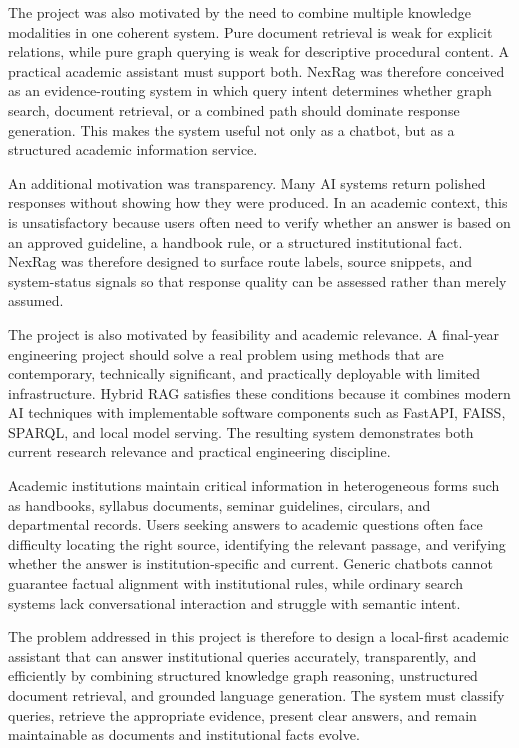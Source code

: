 The project was also motivated by the need to combine multiple knowledge modalities in one coherent system. Pure document retrieval is weak for explicit relations, while pure graph querying is weak for descriptive procedural content. A practical academic assistant must support both. NexRag was therefore conceived as an evidence-routing system in which query intent determines whether graph search, document retrieval, or a combined path should dominate response generation. This makes the system useful not only as a chatbot, but as a structured academic information service.

An additional motivation was transparency. Many AI systems return polished responses without showing how they were produced. In an academic context, this is unsatisfactory because users often need to verify whether an answer is based on an approved guideline, a handbook rule, or a structured institutional fact. NexRag was therefore designed to surface route labels, source snippets, and system-status signals so that response quality can be assessed rather than merely assumed.

The project is also motivated by feasibility and academic relevance. A final-year engineering project should solve a real problem using methods that are contemporary, technically significant, and practically deployable with limited infrastructure. Hybrid RAG satisfies these conditions because it combines modern AI techniques with implementable software components such as FastAPI, FAISS, SPARQL, and local model serving. The resulting system demonstrates both current research relevance and practical engineering discipline.

\label{sec:introduction-problem}

Academic institutions maintain critical information in heterogeneous forms such as handbooks, syllabus documents, seminar guidelines, circulars, and departmental records. Users seeking answers to academic questions often face difficulty locating the right source, identifying the relevant passage, and verifying whether the answer is institution-specific and current. Generic chatbots cannot guarantee factual alignment with institutional rules, while ordinary search systems lack conversational interaction and struggle with semantic intent.

The problem addressed in this project is therefore to design a local-first academic assistant that can answer institutional queries accurately, transparently, and efficiently by combining structured knowledge graph reasoning, unstructured document retrieval, and grounded language generation. The system must classify queries, retrieve the appropriate evidence, present clear answers, and remain maintainable as documents and institutional facts evolve.

